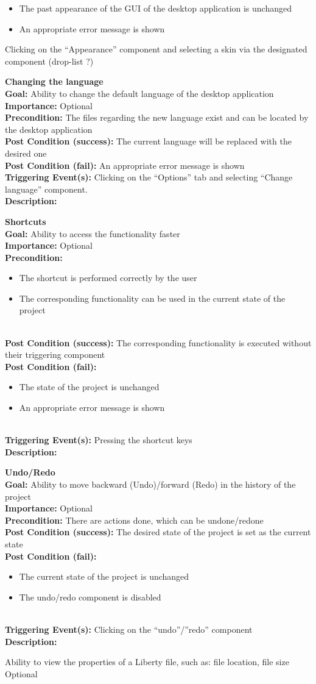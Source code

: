 \documentclass[10pt,a4paper]{report}
\newcommand{\precondition}[1]{
    \textbf{Precondition: } #1 \leavevmode \\
}
\newcommand{\FRODescription}[8]{
    \textbf{#1} \leavevmode \\
    \textbf{Goal: } #2 \leavevmode \\
    \textbf{Importance: } #3 \leavevmode \\
    \precondition{#4}
    \textbf{Post Condition (success): } #5 \leavevmode \\
    \textbf{Post Condition (fail): } #6 \leavevmode \\
    \textbf{Triggering Event(s): } #7 \leavevmode \\
    \textbf{Description: } \leavevmode \\
    #8}
\begin{document}
\begin{FRO}
{\begin{itemize}
        \item The past appearance of the GUI of the desktop application is unchanged
        \item An appropriate error message is shown
    \end{itemize}}
    {Clicking on the “Appearance” component and selecting a skin via the designated component (drop-list ?)}
    \item \FRODescription{Changing the language}
    {Ability to change the default language of the desktop application}
    {Optional}
    {The files regarding the new language exist and can be located by the desktop application}
    {The current language will be replaced with the desired one}
    {An appropriate error message is shown}
    {Clicking on the “Options” tab and selecting “Change language” component.}
    \item \FRODescription{Shortcuts}
    {Ability to access the functionality faster}
    {Optional}
    {\begin{itemize}
        \item The shortcut is performed correctly by the user
        \item The corresponding functionality can be used in the current state of the project
    \end{itemize}}
    {The corresponding functionality is executed without their triggering component}
    {\begin{itemize}
        \item The state of the project is unchanged
        \item An appropriate error message is shown
    \end{itemize}}
    {Pressing the shortcut keys}
    \item \FRODescription{Undo/Redo}
    {Ability to move backward (Undo)/forward (Redo) in the history of the project}
    {Optional}
    {There are actions done, which can be undone/redone}
    {The desired state of the project is set as the current state}
    {\begin{itemize}
        \item The current state of the project is unchanged
        \item The undo/redo component is disabled
    \end{itemize}}
    {Clicking on the “undo”/”redo” component}
    \item {}
    {Ability to view the properties of a Liberty file, such as: file location, file size}
    {Optional}

\end{FRO}
\end{document}
